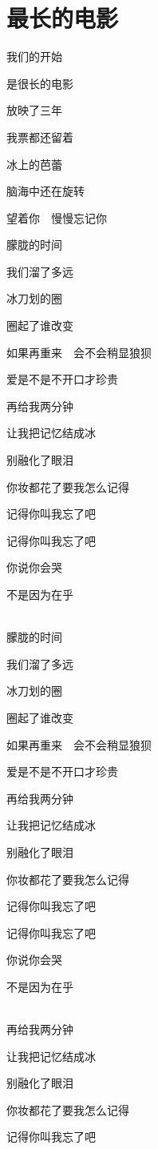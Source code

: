 \documentclass[a4paper,10pt]{article}
\begin{document}
\section{最长的电影}

我们的开始

是很长的电影

放映了三年

我票都还留着

冰上的芭蕾

脑海中还在旋转

望着你　慢慢忘记你

朦胧的时间

我们溜了多远

冰刀划的圈

圈起了谁改变

如果再重来　会不会稍显狼狈

爱是不是不开口才珍贵

再给我两分钟

让我把记忆结成冰

别融化了眼泪

你妆都花了要我怎么记得

记得你叫我忘了吧

记得你叫我忘了吧

你说你会哭

不是因为在乎

\\

朦胧的时间

我们溜了多远

冰刀划的圈

圈起了谁改变

如果再重来　会不会稍显狼狈

爱是不是不开口才珍贵

再给我两分钟

让我把记忆结成冰

别融化了眼泪

你妆都花了要我怎么记得

记得你叫我忘了吧

记得你叫我忘了吧

你说你会哭

不是因为在乎

\\

再给我两分钟

让我把记忆结成冰

别融化了眼泪

你妆都花了要我怎么记得

记得你叫我忘了吧
\end{document}
